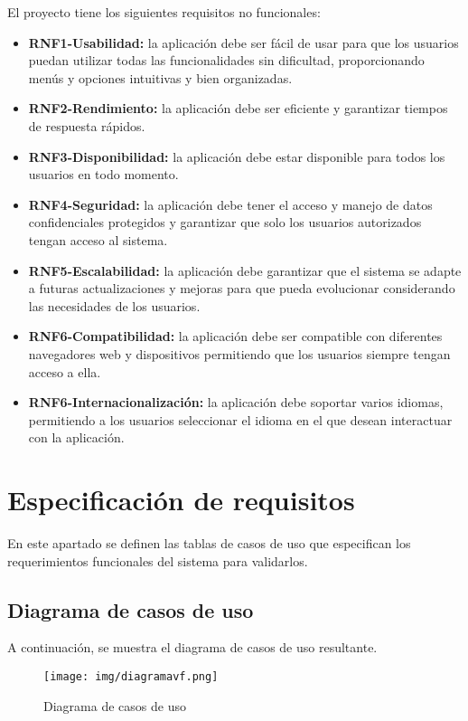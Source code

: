 El proyecto tiene los siguientes requisitos no funcionales:
\begin{itemize}
\tightlist
    \item \textbf{RNF1-Usabilidad:} la aplicación debe ser fácil de usar para que los usuarios puedan utilizar todas las funcionalidades sin dificultad, proporcionando menús y opciones intuitivas y bien organizadas.
    \item \textbf{RNF2-Rendimiento:} la aplicación debe ser eficiente y garantizar tiempos de respuesta rápidos.
    \item \textbf{RNF3-Disponibilidad:} la aplicación debe estar disponible para todos los usuarios en todo momento.
    \item \textbf{RNF4-Seguridad:} la aplicación debe tener el acceso y manejo de datos confidenciales protegidos y garantizar que solo los usuarios autorizados tengan acceso al sistema.
    \item \textbf{RNF5-Escalabilidad:} la aplicación debe garantizar que el sistema se adapte a futuras actualizaciones y mejoras para que pueda evolucionar considerando las necesidades de los usuarios.
    \item \textbf{RNF6-Compatibilidad:} la aplicación debe ser compatible con diferentes navegadores web y dispositivos permitiendo que los usuarios siempre tengan acceso a ella.
    \item \textbf{RNF6-Internacionalización:} la aplicación debe soportar varios idiomas, permitiendo a los usuarios seleccionar el idioma en el que desean interactuar con la aplicación. 
\end{itemize}

\section{Especificación de requisitos}
En este apartado se definen las tablas de casos de uso que especifican los requerimientos funcionales del sistema para validarlos.

\subsection{Diagrama de casos de uso}
A continuación, se muestra el diagrama de casos de uso resultante.
\begin{landscape}
\begin{figure}[h]
    \advance\leftskip-4cm 
    \texttt{[image: img/diagramavf.png]}
    \caption{Diagrama de casos de uso}
\end{figure}
\end{landscape}

